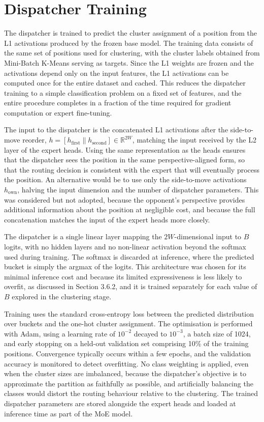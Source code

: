 \section{Dispatcher Training}

The dispatcher is trained to predict the cluster assignment of a position from the L1 activations produced by the frozen base model. The training data consists of the same set of positions used for clustering, with the cluster labels obtained from Mini-Batch K-Means serving as targets. Since the L1 weights are frozen and the activations depend only on the input features, the L1 activations can be computed once for the entire dataset and cached. This reduces the dispatcher training to a simple classification problem on a fixed set of features, and the entire procedure completes in a fraction of the time required for gradient computation or expert fine-tuning.

The input to the dispatcher is the concatenated L1 activations after the side-to-move reorder, $h = [h_{\text{first}} \| h_{\text{second}}] \in \mathbb{R}^{2W}$, matching the input received by the L2 layer of the expert heads. Using the same representation as the heads ensures that the dispatcher sees the position in the same perspective-aligned form, so that the routing decision is consistent with the expert that will eventually process the position. An alternative would be to use only the side-to-move activations $h_{\text{own}}$, halving the input dimension and the number of dispatcher parameters. This was considered but not adopted, because the opponent's perspective provides additional information about the position at negligible cost, and because the full concatenation matches the input of the expert heads more closely.


The dispatcher is a single linear layer mapping the $2W$-dimensional input to $B$ logits, with no hidden layers and no non-linear activation beyond the softmax used during training. The softmax is discarded at inference, where the predicted bucket is simply the argmax of the logits. This architecture was chosen for its minimal inference cost and because its limited expressiveness is less likely to overfit, as discussed in Section 3.6.2, and it is trained separately for each value of $B$ explored in the clustering stage.

Training uses the standard cross-entropy loss between the predicted distribution over buckets and the one-hot cluster assignment. The optimisation is performed with Adam, using a learning rate of $10^{-2}$ decayed to $10^{-3}$, a batch size of 1024, and early stopping on a held-out validation set comprising 10\% of the training positions. Convergence typically occurs within a few epochs, and the validation accuracy is monitored to detect overfitting. No class weighting is applied, even when the cluster sizes are imbalanced, because the dispatcher's objective is to approximate the partition as faithfully as possible, and artificially balancing the classes would distort the routing behaviour relative to the clustering. The trained dispatcher parameters are stored alongside the expert heads and loaded at inference time as part of the MoE model.



